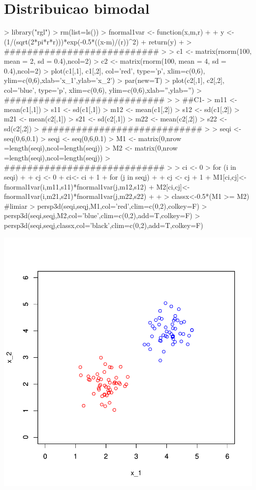 \documentclass{article}
\begin{document}


\section{Distribuicao bimodal}


\begin{Schunk}
\begin{Sinput}
> library("rgl")
> rm(list=ls())
> fnormal1var <- function(x,m,r)
+ {
+   y <- (1/(sqrt(2*pi*r*r)))*exp(-0.5*((x-m)/(r))^2)
+   return(y)
+ }
> ###########################
> 
> c1 <- matrix(rnorm(100, mean = 2, sd = 0.4),ncol=2)
> c2 <- matrix(rnorm(100, mean = 4, sd = 0.4),ncol=2)
> plot(c1[,1], c1[,2], col='red', type='p', xlim=c(0,6), ylim=c(0,6),xlab='x_1',ylab='x_2')
> par(new=T)
> plot(c2[,1], c2[,2], col='blue', type='p', xlim=c(0,6), ylim=c(0,6),xlab='',ylab='')
> ############################
> 
> ##C1-
> m11 <- mean(c1[,1])
> s11 <- sd(c1[,1])
> m12 <- mean(c1[,2])
> s12 <- sd(c1[,2])
> m21 <- mean(c2[,1])
> s21 <- sd(c2[,1])
> m22 <- mean(c2[,2])
> s22 <- sd(c2[,2])
> ############################
> 
> seqi <- seq(0,6,0.1)
> seqj <- seq(0,6,0.1)
> M1 <- matrix(0,nrow =length(seqi),ncol=length(seqj))
> M2 <- matrix(0,nrow =length(seqi),ncol=length(seqj))
> ############################
> 
> ci <- 0
> for (i in seqi)
+ {
+   cj <- 0
+   ci<- ci + 1
+   for (j in seqj)
+   {
+     cj <- cj + 1
+     M1[ci,cj]<-fnormal1var(i,m11,s11)*fnormal1var(j,m12,s12)
+     M2[ci,cj]<-fnormal1var(i,m21,s21)*fnormal1var(j,m22,s22)
+   }
+ }
> classx<-0.5*(M1 >= M2) #limiar
> persp3d(seqi,seqj,M1,col='red',clim=c(0,2),colkey=F)
> persp3d(seqi,seqj,M2,col='blue',clim=c(0,2),add=T,colkey=F)
> persp3d(seqi,seqj,classx,col='black',clim=c(0,2),add=T,colkey=F)
\end{Sinput}
\end{Schunk}
\includegraphics{aula4-001}
\end{document}
